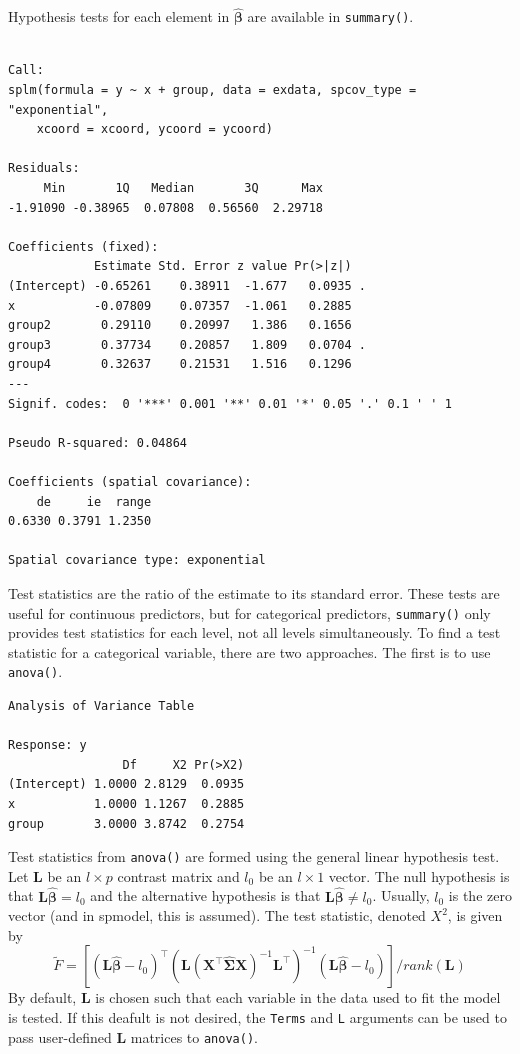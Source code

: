 \documentclass{article}
\begin{document}
Hypothesis tests for each element in \(\hat{\bm{\beta}}\) are available
in \texttt{summary()}.

\begin{verbatim}

Call:
splm(formula = y ~ x + group, data = exdata, spcov_type = "exponential", 
    xcoord = xcoord, ycoord = ycoord)

Residuals:
     Min       1Q   Median       3Q      Max 
-1.91090 -0.38965  0.07808  0.56560  2.29718 

Coefficients (fixed):
            Estimate Std. Error z value Pr(>|z|)  
(Intercept) -0.65261    0.38911  -1.677   0.0935 .
x           -0.07809    0.07357  -1.061   0.2885  
group2       0.29110    0.20997   1.386   0.1656  
group3       0.37734    0.20857   1.809   0.0704 .
group4       0.32637    0.21531   1.516   0.1296  
---
Signif. codes:  0 '***' 0.001 '**' 0.01 '*' 0.05 '.' 0.1 ' ' 1

Pseudo R-squared: 0.04864

Coefficients (spatial covariance):
    de     ie  range 
0.6330 0.3791 1.2350 

Spatial covariance type: exponential
\end{verbatim}

Test statistics are the ratio of the estimate to its standard error.
These tests are useful for continuous predictors, but for categorical
predictors, \texttt{summary()} only provides test statistics for each
level, not all levels simultaneously. To find a test statistic for a
categorical variable, there are two approaches. The first is to use
\texttt{anova()}.

\begin{verbatim}
Analysis of Variance Table

Response: y
                Df     X2 Pr(>X2)
(Intercept) 1.0000 2.8129  0.0935
x           1.0000 1.1267  0.2885
group       3.0000 3.8742  0.2754
\end{verbatim}

Test statistics from \texttt{anova()} are formed using the general
linear hypothesis test. Let \(\mathbf{L}\) be an \(l \times p\) contrast
matrix and \(l_0\) be an \(l \times 1\) vector. The null hypothesis is
that \(\mathbf{L} \bm{\hat{\beta}} = l_0\) and the alternative
hypothesis is that \(\mathbf{L} \bm{\hat{\beta}} \neq l_0\). Usually,
\(l_0\) is the zero vector (and in spmodel, this is assumed). The test
statistic, denoted \(X^2\), is given by \begin{equation}\label{eq:glht}
  \tilde{F} = [(\mathbf{L} \bm{\hat{\beta}} - l_0)^\intercal(\mathbf{L} (\mathbf{X}^\intercal \mathbf{\hat{\Sigma}} \mathbf{X})^{-1} \mathbf{L}^\intercal)^{-1}(\mathbf{L} \bm{\hat{\beta}} - l_0)]/ rank(\mathbf{L})
\end{equation} By default, \(\mathbf{L}\) is chosen such that each
variable in the data used to fit the model is tested. If this deafult is
not desired, the \texttt{Terms} and \texttt{L} arguments can be used to
pass user-defined \(\mathbf{L}\) matrices to \texttt{anova()}.
\end{document}
